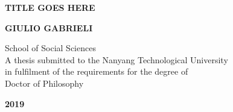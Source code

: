 \pagestyle{plain}
\thispagestyle{empty}
\begin{center}
    \vspace*{2cm}

    \Large{\Large{\textbf{TITLE GOES HERE}}}
    
    \vspace{6cm}
    
    \large{\textbf{GIULIO GABRIELI}}
    
    \vspace{8cm}
    
    School of Social Sciences\\
    
    \vspace{1cm}
    A thesis submitted to the Nanyang Technological University\\
    in fulfilment of the requirements for the degree of\\
    Doctor of Philosophy\\
    
    \vspace{1cm}
    
    \Large{\textbf{2019}}
  
\end{center}

